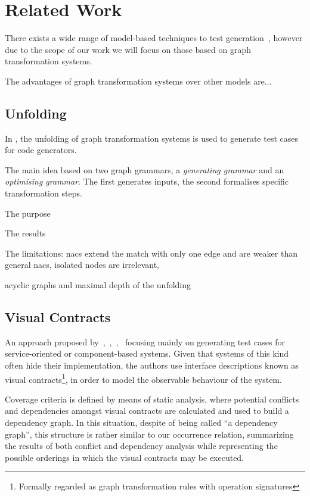 \chapter{Related Work}\label{ch:related-work}

There exists a wide range of model-based techniques to test generation~\cite{Utting2006}, however due to the scope of our work we will focus on those based on graph transformation systems.

The advantages of graph transformation systems over other models are...

\section{Unfolding}

In \cite{Baldan2004}, the unfolding of graph transformation systems is used to generate test cases for code generators.

The main idea based on two graph grammars, a \textit{generating grammar} and an \textit{optimising grammar}. The first generates inputs, the second formalises specific transformation steps.

The purpose

The results

The limitations: nacs extend the match with only one edge and are weaker than general nacs, isolated nodes are irrelevant, 

acyclic graphs and maximal depth of the unfolding

\section{Visual Contracts}

An approach proposed by~\cite{Heckel2011},~\cite{Khan2012},~\cite{Khan2012a},~\cite{Runge2013} focusing mainly on generating test cases for service-oriented or component-based systems. Given that systems of this kind often hide their implementation, the authors use interface descriptions known as visual contracts\footnote{ Formally regarded as graph transformation rules with operation signatures}, in order to model the observable behaviour of the system.

Coverage criteria is defined by means of static analysis, where potential conflicts and dependencies amongst visual contracts are calculated and used to build a dependency graph. In this situation, despite of being called ``a dependency graph'', this structure is rather similar to our occurrence relation, summarizing the results of both conflict and dependency analysis while representing the possible orderings in which the visual contracts may be executed.

